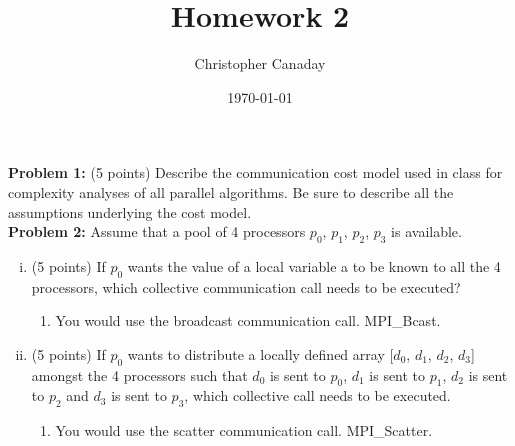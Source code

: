 \documentclass{article}
\title{Homework 2}
\author{Christopher Canaday}
\date{\today}
\begin{document}
    \maketitle
    \textbf{Problem 1:} (5 points) Describe the communication cost model used in class for complexity analyses of all
    parallel algorithms. Be sure to describe all the assumptions underlying the cost model. \hfill \\

    \textbf{Problem 2:} Assume that a pool of 4 processors {$p_{0}$, $p_{1}$, $p_{2}$, $p_{3}$} is available.
    \begin{enumerate}[i.]
    \item (5 points) If $p_{0}$ wants the value of a local variable a to be known to all the 4 processors, which collective
    communication call needs to be executed?
    \begin{enumerate}
        \item You would use the broadcast communication call. MPI\_Bcast.
    \end{enumerate}

    \item (5 points) If $p_{0}$ wants to distribute a locally defined array [$d_{0}$, $d_{1}$, $d_{2}$, $d_{3}$] amongst the 4 processors such
that $d_{0}$ is sent to $p_{0}$, $d_{1}$ is sent to $p_{1}$, $d_{2}$ is sent to $p_{2}$ and $d_{3}$ is sent to $p_{3}$, which collective call needs to be
executed.
    \begin{enumerate}
        \item You would use the scatter communication call. MPI\_Scatter.
    \end{enumerate}
    \end{enumerate}
    
\end{document}
